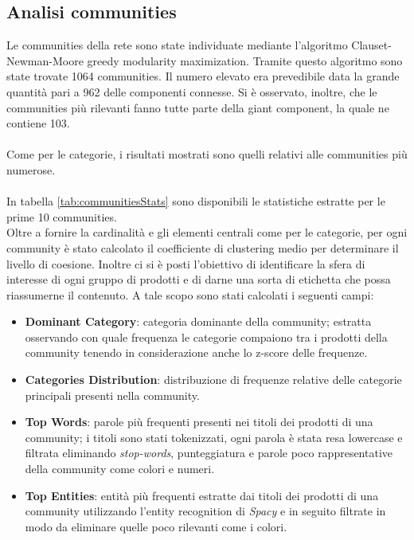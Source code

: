 \subsection{Analisi communities}
Le communities della rete sono state individuate mediante l'algoritmo Clauset-Newman-Moore greedy modularity maximization. Tramite questo algoritmo sono state trovate 1064 communities. Il numero elevato era prevedibile data la grande quantità pari a 962 delle componenti connesse. Si è osservato, inoltre, che le communities più rilevanti fanno tutte parte della giant component, la quale ne contiene 103. \\\\
Come per le categorie, i risultati mostrati sono quelli relativi alle communities più numerose. 
\\\\
In tabella \ref{tab:communitiesStats} sono disponibili le statistiche estratte per le prime 10 communities. \\
Oltre a fornire la cardinalità e gli elementi centrali come per le categorie, per ogni community è stato calcolato il coefficiente di clustering medio per determinare il livello di coesione.  Inoltre ci si è posti l'obiettivo di identificare la sfera di interesse di ogni gruppo di prodotti e di darne una sorta di etichetta che possa riassumerne il contenuto. A tale scopo sono stati calcolati i seguenti campi:
\begin{itemize}
    \item \textbf{Dominant Category}: categoria dominante della community; estratta osservando con quale frequenza le categorie compaiono tra i prodotti della community tenendo in considerazione anche lo z-score delle frequenze.
    \item \textbf{Categories Distribution}: distribuzione di frequenze relative delle categorie principali presenti nella community.
    \item \textbf{Top Words}: parole più frequenti presenti nei titoli dei prodotti di una community; i titoli sono stati tokenizzati, ogni parola è stata resa lowercase e filtrata eliminando \textit{stop-words}, punteggiatura e parole poco rappresentative della community come colori e numeri.
    \item \textbf{Top Entities}: entità più frequenti estratte dai titoli dei prodotti di una community utilizzando l'entity recognition di \textit{Spacy} e in seguito filtrate in modo da eliminare quelle poco rilevanti come i colori.
\end{itemize}

